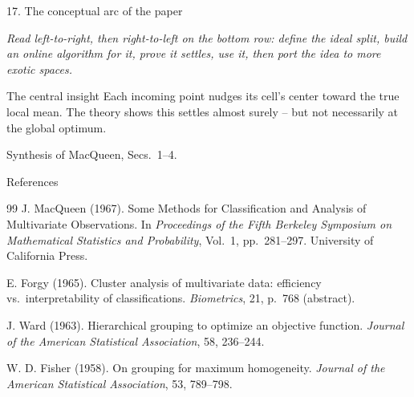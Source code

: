 \documentclass[10pt,compress]{beamer}
\newcommand{\defline}[1]{{\footnotesize\textcolor{aggiemaroon}{\textit{#1}}\par}}
\begin{document}
\begin{frame}{17. The conceptual arc of the paper}
\begin{center}
\end{center}
\defline{Read left-to-right, then right-to-left on the bottom row: define the ideal split, build an online algorithm for it, prove it settles, use it, then port the idea to more exotic spaces.}
\begin{block}{\footnotesize The central insight}
\small Each incoming point nudges its cell's center toward the true local mean. The theory shows this settles almost surely -- but not necessarily at the global optimum.
\end{block}
\vfill
{\scriptsize Synthesis of MacQueen, Secs.~1--4.}
\end{frame}

\begin{frame}{References}
\footnotesize
\begin{thebibliography}{99}
J. MacQueen (1967).
\newblock Some Methods for Classification and Analysis of Multivariate Observations.
\newblock In \emph{Proceedings of the Fifth Berkeley Symposium on Mathematical Statistics and Probability}, Vol.~1, pp.~281--297.
\newblock University of California Press.

E. Forgy (1965).
\newblock Cluster analysis of multivariate data: efficiency vs.\ interpretability of classifications.
\newblock \emph{Biometrics}, 21, p.~768 (abstract).

J. Ward (1963).
\newblock Hierarchical grouping to optimize an objective function.
\newblock \emph{Journal of the American Statistical Association}, 58, 236--244.

W. D. Fisher (1958).
\newblock On grouping for maximum homogeneity.
\newblock \emph{Journal of the American Statistical Association}, 53, 789--798.
\end{thebibliography}
\end{frame}
\end{document}
